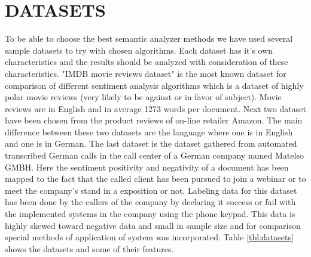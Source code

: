 \section{DATASETS}
	To be able to choose the best semantic analyzer methods we have used several sample datasets to try with chosen algorithms. Each dataset has it's own characteristics and the results should be analyzed with consideration of these characteristics. "IMDB movie reviews dataset\cite{imdbdataset}" is the most known dataset for comparison of different sentiment analysis algorithms which is a dataset of highly polar movie reviews (very likely to be against or in favor of subject). 
	Movie reviews are in English and in average 1273 words per document. Next two dataset have been chosen from the product reviews of on-line retailer Amazon. The main difference between these two datasets are the language where one is in English and one is in German. The last dataset is the dataset gathered from automated transcribed German calls in the call center of a German company named Matelso GMBH. Here the sentiment positivity and negativity of a document has been mapped to the fact that the called client has been pursued to join a webinar or to meet the company's stand in a exposition or not. Labeling data for this dataset has been done by the callers of the company by declaring it success or fail with the implemented systems in the company using the phone keypad. This data is highly skewed toward negative data and small in sample size and for comparison special methods of application of system was incorporated. Table \ref{tbl:datasets} shows the datasets and some of their features.

